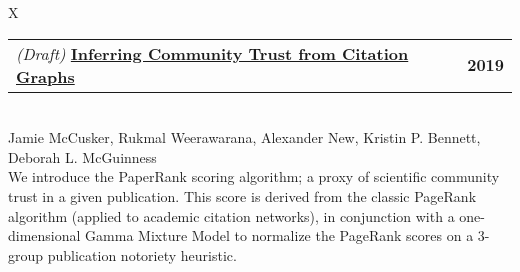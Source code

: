 \documentclass[10pt]{article}
\newcommand{\tabularxwidth}{\textwidth}
\newcommand{\changeurlcolor}[1]{\hypersetup{urlcolor=#1}}
\begin{document}
        \begin{minipage}{\tabularxwidth}
        \begin{tabularx}{\tabularxwidth}{X}
            {
                \begin{tabularx}{\tabularxwidth}{@{}X r}
                        \textit{(Draft) }
                    \textbf{\changeurlcolor{black}\href{https://drive.google.com/open?id=1SlSfZrwOQYP0mrKbrGLjjAFzWCk-qlwm}{Inferring Community Trust from Citation Graphs}} &
                    \textbf{
        2019} \\
                \end{tabularx}
            } \\
            Jamie McCusker, Rukmal Weerawarana, Alexander New, Kristin P. Bennett, Deborah L. McGuinness \\

            
            

            
    We introduce the PaperRank scoring algorithm; a proxy of scientific community trust in a given publication. This score is derived from the classic PageRank algorithm (applied to academic citation networks), in conjunction with a one-dimensional Gamma Mixture Model to normalize the PageRank scores on a 3-group publication notoriety heuristic.
        \end{tabularx}

        
            \vspace{.3em}
        

        \end{minipage}
    
\end{document}
